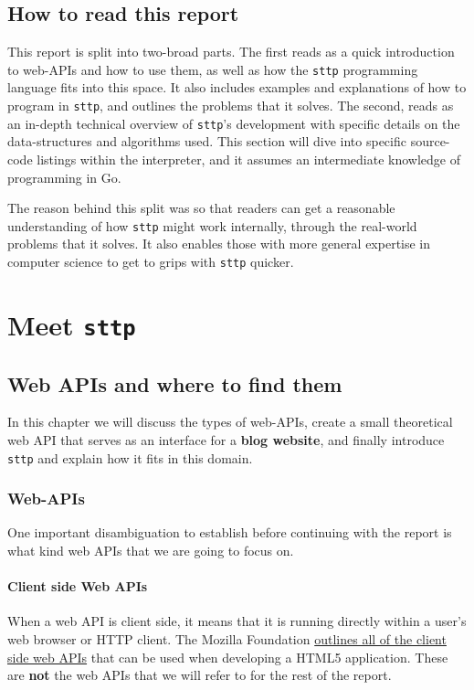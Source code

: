 \documentclass[]{full}
\theoremstyle{definition}
\begin{document}
\chapter{How to read this report}

This report is split into two-broad parts. The first reads as a quick introduction to web-APIs and how to use them, as well as how the \verb|sttp| programming language fits into this space. It also includes examples and explanations of how to program in \verb|sttp|, and outlines the problems that it solves. The second, reads as an in-depth technical overview of \verb|sttp|'s development with specific details on the data-structures and algorithms used. This section will dive into specific source-code listings within the interpreter, and it assumes an intermediate knowledge of programming in Go.

The reason behind this split was so that readers can get a reasonable understanding of how \verb|sttp| might work internally, through the real-world problems that it solves. It also enables those with more general expertise in computer science to get to grips with \verb|sttp| quicker.

\cprotect\part{Meet \verb|sttp|}

\chapter{Web APIs and where to find them}

In this chapter we will discuss the types of web-APIs, create a small theoretical web API that serves as an interface for a \textbf{blog website}, and finally introduce \verb|sttp| and explain how it fits in this domain.

\section{Web-APIs}

One important disambiguation to establish before continuing with the report is what kind web APIs that we are going to focus on.

\subsection{Client side Web APIs}

When a web API is client side, it means that it is running directly within a user's web browser or HTTP client. The Mozilla Foundation \href{https://developer.mozilla.org/en-US/docs/Web/API}{outlines all of the client side web APIs} that can be used when developing a HTML5 application. These are \textbf{not} the web APIs that we will refer to for the rest of the report.
\end{document}
